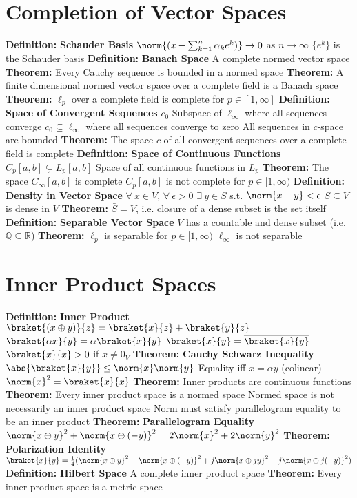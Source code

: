 \documentclass[14pt]{extarticle}
\def\Definition{{\color{blue} \textbf{Definition:} }}
\def\Theorem{{\color{red} \textbf{Theorem:} }}
\begin{document}
\begin{outline}
	\section*{Completion of Vector Spaces}
		\1	\Definition \textbf{Schauder Basis}
			\2	$\norm{(x - \sum_{k=1}^n \alpha_k e^k)} \rightarrow 0$ as $n \rightarrow \infty$
			\2	$\{e^k\}$ is the Schauder basis
		\1	\Definition \textbf{Banach Space}
			\2	A complete normed vector space
		\1	\Theorem Every Cauchy sequence is bounded in a normed space
		\1	\Theorem A finite dimensional normed vector space over a complete field
				is a Banach space
		\1	\Theorem $\ell_p$ over a complete field is complete for $p \in [1,\infty]$
		\1	\Definition \textbf{Space of Convergent Sequences} $c_0$
			\2	Subspace of $\ell_{\infty}$ where all sequences converge
			\2	$c_0 \subseteq \ell_{\infty}$ where all sequences converge to zero
				\3	All sequences in $c$-space are bounded
		\1	\Theorem The space $c$ of all convergent sequences over a complete field
				is complete
		\1	\Definition \textbf{Space of Continuous Functions}
			\2	$C_p[a,b] \subsetneq L_p[a,b]$
			\2	Space of all continuous functions in $L_p$
		\1	\Theorem The space $C_{\infty}[a,b]$ is complete
			\2	$C_p[a,b]$ is not complete for $p \in [1,\infty)$
		\1	\Definition \textbf{Density in Vector Space}
			\2	$\forall~x \in V$, $\forall~\epsilon > 0$ $\exists~y \in S$ s.t. $\norm{x-y} < \epsilon$
			\2	$S \subseteq V$ is dense in $V$
		\1	\Theorem $\bar{S} = V$, i.e. closure of a dense subset is the set itself
		\1	\Definition \textbf{Separable Vector Space}
			\2	$V$ has a countable and dense subset (i.e. $\mathbb{Q} \subseteq \mathbb{R}$)
		\1	\Theorem $\ell_p$ is separable for $p \in [1,\infty)$
			\2	$\ell_{\infty}$ is not separable
	\section*{Inner Product Spaces}
		\1	\Definition \textbf{Inner Product}
			\2	$\braket{(x \oplus y)}{z} = \braket{x}{z} + \braket{y}{z}$
			\2	$\braket{\alpha x}{y} = \alpha \braket{x}{y}$
			\2	$\braket{x}{y} = \overline{\braket{x}{y}}$
			\2	$\braket{x}{x} > 0$ if $x \ne 0_V$
		\1	\Theorem \textbf{Cauchy Schwarz Inequality}
			\2	$\abs{\braket{x}{y}} \le \norm{x}\norm{y}$
				\3	Equality iff $x = \alpha y$ (colinear)
			\2	$\norm{x}^2 = \braket{x}{x}$
		\1	\Theorem Inner products are continuous functions
		\1	\Theorem Every inner product space is a normed space
			\2	Normed space is not necessarily an inner product space
			\2	Norm must satisfy parallelogram equality to be an inner product
		\1	\Theorem	\textbf{Parallelogram Equality}
			\2	$\norm{x \oplus y}^2 + \norm{x \oplus (-y)}^2 = 2\norm{x}^2 + 2\norm{y}^2$
		\1	\Theorem	\textbf{Polarization Identity}
			\2	$\braket{x}{y} = \frac{1}{4}(\norm{x \oplus y}^2 - \norm{x \oplus (-y)}^2 
			+ j\norm{x \oplus jy}^2 - j\norm{x \oplus j(-y)}^2)$
		\1	\Definition \textbf{Hilbert Space}
			\2	A complete inner product space
		\1	\Theorem Every inner product space is a metric space

\end{outline}
\end{document}

